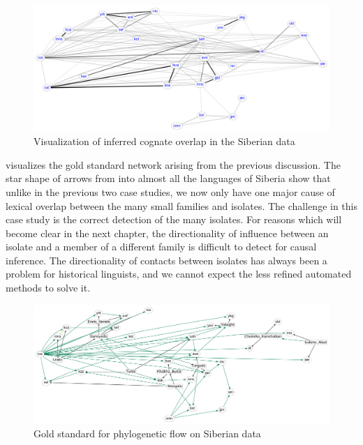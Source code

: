 \begin{figure}
 \includegraphics[width=\textwidth]{figures/cognacy-strength-siberia.pdf}
 \caption{Visualization of inferred cognate overlap in the Siberian data}
 \label{siberia-cognacy}
\end{figure}

 visualizes the gold standard network arising from the previous discussion. The star shape of arrows from  into almost all the languages of Siberia show that unlike in the previous two case studies, we now only have one major cause of lexical overlap between the many small families and isolates. The challenge in this case study is the correct detection of the many isolates. For reasons which will become clear in the next chapter, the directionality of influence between an isolate and a member of a different family is difficult to detect for causal inference. The directionality of contacts between isolates has always been a problem for historical linguists, and we cannot expect the less refined automated methods to solve it.

\begin{figure}
 \includegraphics[width=\textwidth]{figures/goldstandard-phylo-siberia.pdf}
 \caption{Gold standard for phylogenetic flow on Siberian data}
 \label{siberia-goldstandard-phylo}
\end{figure}

